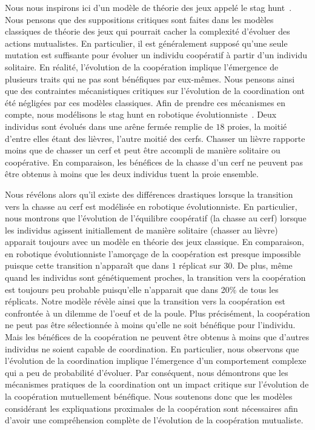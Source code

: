			Nous nous inspirons ici d'un modèle de théorie des jeux appelé le stag hunt~\parencite{Skyrms2004}. Nous pensons que des suppositions critiques sont faites dans les modèles classiques de théorie des jeux qui pourrait cacher la complexité d'évoluer des actions mutualistes. En particulier, il est généralement supposé qu'une seule mutation est suffisante pour évoluer un individu coopératif à partir d'un individu solitaire. En réalité, l'évolution de la coopération implique l'émergence de plusieurs traits qui ne pas sont bénéfiques par eux-mêmes. Nous pensons ainsi que des contraintes mécanistiques critiques sur l'évolution de la coordination ont été négligées par ces modèles classiques. Afin de prendre ces mécanismes en compte, nous modélisons le stag hunt en robotique évolutionniste~\parencite{Nolfi2000, Doncieux2015}. Deux individus sont évolués dans une arêne fermée remplie de $18$ proies, la moitié d'entre elles étant des lièvres, l'autre moitié des cerfs. Chasser un lièvre rapporte moins que de chasser un cerf et peut être accompli de manière solitaire ou coopérative. En comparaison, les bénéfices de la chasse d'un cerf ne peuvent pas être obtenus à moins que les deux individus tuent la proie ensemble.

			Nous révélons alors qu'il existe des différences drastiques lorsque la transition vers la chasse au cerf est modélisée en robotique évolutionniste. En particulier, nous montrons que l'évolution de l'équilibre coopératif (la chasse au cerf) lorsque les individus agissent initiallement de manière solitaire (chasser au lièvre) apparait toujours avec un modèle en théorie des jeux classique. En comparaison, en robotique évolutionniste l'amorçage de la coopération est presque impossible puisque cette transition n'apparaît que dans $1$ réplicat sur $30$. De plus, même quand les individus sont génétiquement proches, la transition vers la coopération est toujours peu probable puisqu'elle n'apparait que dans 20\% de tous les réplicats. Notre modèle révèle ainsi que la transition vers la coopération est confrontée à un dilemme de l'oeuf et de la poule. Plus précisément, la coopération ne peut pas être sélectionnée à moins qu'elle ne soit bénéfique pour l'individu. Mais les bénéfices de la coopération ne peuvent être obtenus à moins que d'autres individus ne soient capable de coordination. En particulier, nous observons que l'évolution de la coordination implique l'émergence d'un comportement complexe qui a peu de probabilité d'évoluer. Par conséquent, nous démontrons que les mécanismes pratiques de la coordination ont un impact critique sur l'évolution de la coopération mutuellement bénéfique. Nous soutenons donc que les modèles considérant les expliquations proximales de la coopération sont nécessaires afin d'avoir une compréhension complète de l'évolution de la coopération mutualiste.


